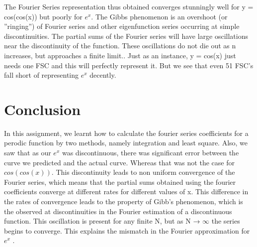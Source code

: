 \documentclass{article}
\begin{document}
\hfill \break
\hfill \break

The Fourier Series representation thus obtained converges stunningly well for y = cos(cos(x)) but poorly for $e^x$. 
\newline \newline
The Gibbs phenomenon is an overshoot (or ”ringing”) of Fourier series and other eigenfunction series occurring at simple discontinuities. The partial sums of the Fourier series will have large oscillations near the discontinuity of the function. 
\newline \newline
These oscillations do not die out as n increases, but approaches a finite limit.. Just as an instance, y = cos(x) just needs one FSC and this will perfectly represent it. But we see that even 51 FSC's fall short of representing $e^x$ decently.

\newpage
\section{Conclusion}

\par In this assignment, we learnt how to calculate the fourier series coefficients for a perodic function by two methods, namely integration and least square.
\newline \newline
Also, we saw that as our $e^x$ was discontinuous, there was significant error between the curve we predicted and the actual curve. Whereas that was not the case for $cos(cos(x))$. This discontinuity leads to non uniform convergence of the Fourier series, which means that the partial sums obtained using the fourier coefficients converge at different rates for different values of x.
\newline \newline
This difference in the rates of convergence leads to the property of Gibb’s phenomenon, which is the observed at discontinuities in the Fourier estimation of a discontinuous function. This oscillation is present for any finite N, but as N → ${\infty}$ the series begins to converge. This explains the mismatch in the Fourier approximation for $e^x$ .
\end{document}
